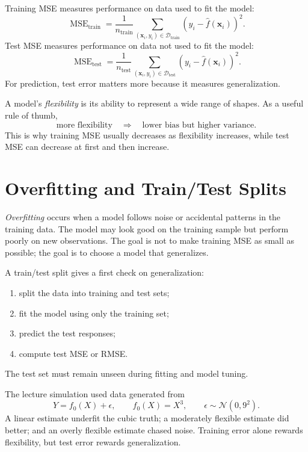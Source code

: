 {Training MSE measures performance on data used to fit the model:
\begin{equation}
  \operatorname{MSE}_{\text{train}}
  =\frac{1}{n_{\text{train}}}\sum_{(\mathbf{x}_i,y_i)\in\mathcal{D}_{\text{train}}}
  \left(y_i-\hat f(\mathbf{x}_i)\right)^2.
  \label{eq:ch2-training-mse}
\end{equation}
Test MSE measures performance on data not used to fit the model:
\begin{equation}
  \operatorname{MSE}_{\text{test}}
  =\frac{1}{n_{\text{test}}}\sum_{(\mathbf{x}_i,y_i)\in\mathcal{D}_{\text{test}}}
  \left(y_i-\hat f(\mathbf{x}_i)\right)^2.
  \label{eq:ch2-test-mse}
\end{equation}
For prediction, test error matters more because it measures generalization.

A model's \emph{flexibility} is its ability to represent a wide range of shapes.  As a useful rule of thumb,
\begin{equation}
  \text{more flexibility} \quad \Longrightarrow \quad
  \text{lower bias but higher variance}.
  \label{eq:ch2-flexibility-rule}
\end{equation}
This is why training MSE usually decreases as flexibility increases, while test MSE can decrease at first and then increase.

\section{Overfitting and Train/Test Splits}

\emph{Overfitting} occurs when a model follows noise or accidental patterns in the training data.  The model may look good on the training sample but perform poorly on new observations.  The goal is not to make training MSE as small as possible; the goal is to choose a model that generalizes.

A train/test split gives a first check on generalization:
\begin{enumerate}
  \item split the data into training and test sets;
  \item fit the model using only the training set;
  \item predict the test responses;
  \item compute test MSE or RMSE.
\end{enumerate}
The test set must remain unseen during fitting and model tuning.

The lecture simulation used data generated from
\begin{equation}
  Y=f_0(X)+\epsilon,
  \qquad
  f_0(X)=X^3,
  \qquad
  \epsilon\sim\mathcal{N}(0,9^2).
  \label{eq:ch2-simulation-model}
\end{equation}
A linear estimate underfit the cubic truth; a moderately flexible estimate did better; and an overly flexible estimate chased noise.  Training error alone rewards flexibility, but test error rewards generalization.

}
